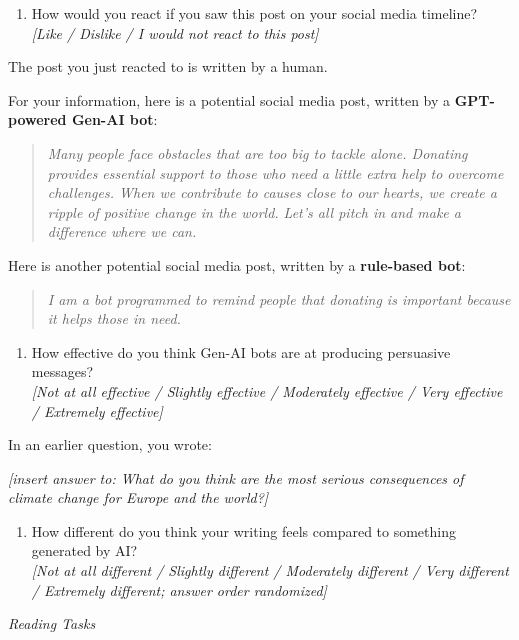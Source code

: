 \documentclass[12pt,notitlepage]{article}
\theoremstyle{plain}
\theoremstyle{plain}
\theoremstyle{definition}
\theoremstyle{definition}
\theoremstyle{assumption}
\theoremstyle{plain}
\theoremstyle{plain}
\theoremstyle{plain}
\theoremstyle{plain}
\theoremstyle{definition}%
\theoremstyle{plain}
\theoremstyle{plain}
\theoremstyle{plain}
\theoremstyle{plain}
\begin{document}
\begin{enumerate}
\item How would you react if you saw this post on your social media timeline?\\
\emph{[Like / Dislike / I would not react to this post]}
\end{enumerate}

The post you just reacted to is written by a human.

For your information, here is a potential social media post, written by a \textbf{GPT-powered Gen-AI bot}:

\begin{quote}
\emph{Many people face obstacles that are too big to tackle alone. Donating provides essential support to those who need a little extra help to overcome challenges. When we contribute to causes close to our hearts, we create a ripple of positive change in the world. Let's all pitch in and make a difference where we can.}
\end{quote}

Here is another potential social media post, written by a \textbf{rule-based bot}:

\begin{quote}
\emph{I am a bot programmed to remind people that donating is important because it helps those in need.}
\end{quote}

\begin{enumerate}
\item How effective do you think Gen-AI bots are at producing persuasive messages?\\
\emph{[Not at all effective / Slightly effective / Moderately effective / Very effective / Extremely effective]}
\end{enumerate}

In an earlier question, you wrote:

\emph{[insert answer to: What do you think are the most serious consequences of climate change for Europe and the world?]}

\begin{enumerate}
\item How different do you think your writing feels compared to something generated by AI?\\
\emph{[Not at all different / Slightly different / Moderately different / Very different / Extremely different; answer order randomized]}
\end{enumerate}

\vspace{12pt}
\emph{Reading Tasks}
\end{document}
